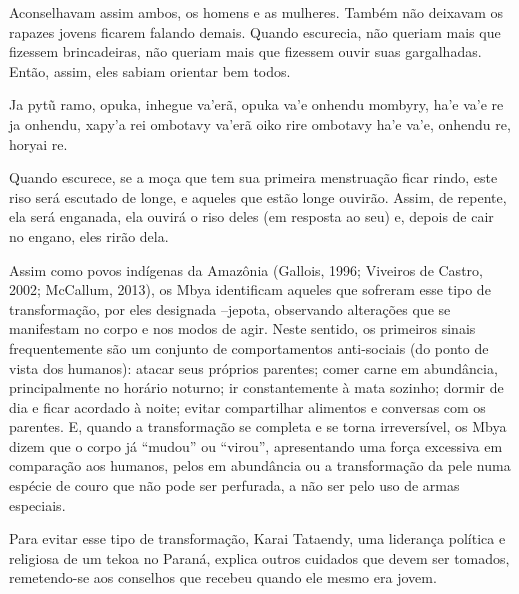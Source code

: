 \begin{paracol}{2}
\bigskip

\switchcolumn
\noindent
Aconselhavam assim ambos, os homens e as mulheres. Também não deixavam
os rapazes jovens ficarem falando demais. Quando escurecia, não queriam
mais que fizessem brincadeiras, não queriam mais que fizessem ouvir
suas gargalhadas. Então, assim, eles sabiam orientar bem todos. 

\smallskip

\switchcolumn
\noindent
Ja pytũ ramo, opuka, inhegue va’erã, opuka va’e onhendu mombyry, ha’e
va’e re ja onhendu, xapy’a rei ombotavy va’erã oiko rire ombotavy ha’e
va’e, onhendu re, horyai re.

\bigskip

\switchcolumn
\noindent
Quando escurece, se a moça que tem sua primeira menstruação ficar rindo,
este riso será escutado de longe, e aqueles que estão longe ouvirão.
Assim, de repente, ela será enganada, ela ouvirá o riso deles (em
resposta ao seu) e, depois de cair no engano, eles rirão
dela.\footnotemark{}
\end{paracol}

Assim como povos indígenas da Amazônia (Gallois, 1996; Viveiros de
Castro, 2002; McCallum, 2013), os Mbya identificam aqueles que sofreram
esse tipo de transformação, por eles designada –jepota, observando
alterações que se manifestam no corpo e nos modos de agir. Neste
sentido, os primeiros sinais frequentemente são um conjunto de
comportamentos anti-sociais (do ponto de vista dos humanos): atacar
seus próprios parentes; comer carne em abundância, principalmente no
horário noturno; ir constantemente à mata sozinho; dormir de dia e
ficar acordado à noite; evitar compartilhar alimentos e conversas com
os parentes. E, quando a transformação se completa e se torna
irreversível, os Mbya dizem que o corpo já ``mudou'' ou ``virou'',
apresentando uma força excessiva em comparação aos humanos, pelos em
abundância ou a transformação da pele numa espécie de couro que não
pode ser perfurada, a não ser pelo uso de armas especiais. 

Para evitar esse tipo de transformação, Karai Tataendy, uma liderança
política e religiosa de um tekoa no Paraná, explica outros cuidados que
devem ser tomados, remetendo-se aos conselhos que recebeu quando ele
mesmo era jovem. 

